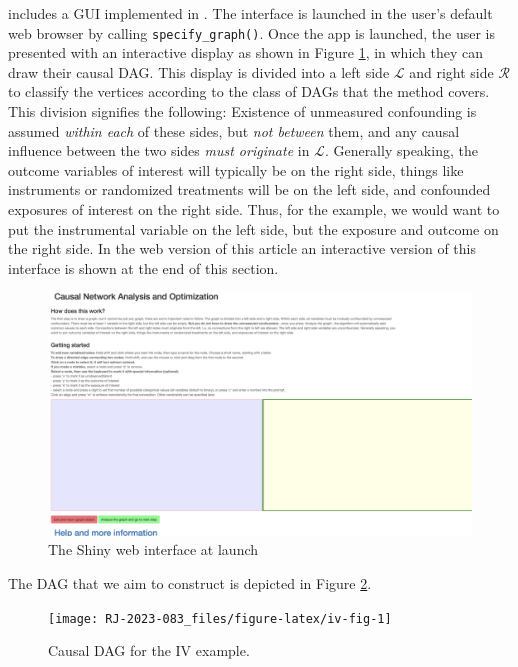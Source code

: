  includes a GUI implemented in  \citep{shiny}. The interface is launched in the user's default web browser by calling \texttt{specify\_graph()}.
Once the  app is launched, the user is presented with an interactive display as shown in Figure \ref{fig:InterfaceStart}, in which they can draw their causal DAG. This display is divided into a left side \(\mathcal{L}\) and right side \(\mathcal{R}\) to classify the vertices according to the class of DAGs that the method covers. This division signifies the following: Existence of unmeasured confounding is assumed \emph{within each} of these sides, but \emph{not between} them, and any causal influence between the two sides \emph{must originate} in \(\mathcal{L}\). Generally speaking, the outcome variables of interest will typically be on the right side, things like instruments or randomized treatments will be on the left side, and confounded exposures of interest on the right side. Thus, for the example, we would want to put the instrumental variable on the left side, but the exposure and outcome on the right side. In the web version of this article an interactive version of this interface is shown at the end of this section.

\begin{figure}

{\centering \includegraphics[width=1\linewidth]{figures/InterfaceStart2} 

}

\caption{The Shiny web interface at launch}\label{fig:InterfaceStart}
\end{figure}

The DAG that we aim to construct is depicted in Figure \ref{fig:iv-fig}.

\begin{figure}

{\centering \texttt{[image: RJ-2023-083\_files/figure-latex/iv-fig-1]} 

}

\caption{Causal DAG for the IV example.}\label{fig:iv-fig}
\end{figure}


